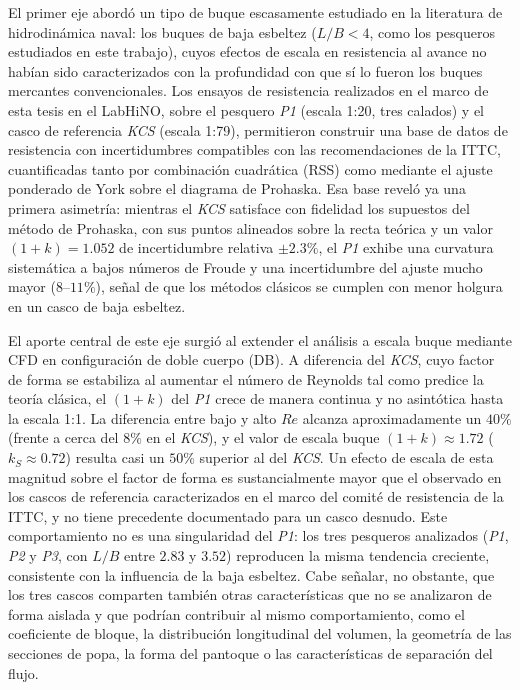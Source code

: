 El primer eje abordó un tipo de buque escasamente estudiado en la literatura de
hidrodinámica naval: los buques de baja esbeltez ($L/B < 4$, como los pesqueros
estudiados en este trabajo), cuyos efectos de escala en resistencia al avance no
habían sido caracterizados con la profundidad con que sí lo fueron los buques
mercantes convencionales. Los ensayos de resistencia realizados en el marco de esta
tesis en el LabHiNO, sobre el pesquero \textit{P1} (escala 1:20, tres calados) y el
casco de referencia \textit{KCS} (escala 1:79), permitieron construir una base de datos de resistencia con
incertidumbres compatibles con las recomendaciones de la ITTC, cuantificadas tanto
por combinación cuadrática (RSS) como mediante el ajuste ponderado de York sobre el
diagrama de Prohaska. Esa base reveló ya una primera asimetría: mientras el
\textit{KCS} satisface con fidelidad los supuestos del método de Prohaska, con sus
puntos alineados sobre la recta teórica y un valor $(1+k) = 1{.}052$ de
incertidumbre relativa $\pm 2{.}3\%$, el \textit{P1} exhibe una curvatura
sistemática a bajos números de Froude y una incertidumbre del ajuste mucho mayor
($8$--$11\%$), señal de que los métodos clásicos se cumplen con menor holgura en un
casco de baja esbeltez.

El aporte central de este eje surgió al extender el análisis a escala buque
mediante CFD en configuración de doble cuerpo (DB). A diferencia del \textit{KCS},
cuyo factor de forma se estabiliza al aumentar el número de Reynolds tal como
predice la teoría clásica, el $(1+k)$ del \textit{P1} crece de manera continua y no
asintótica hasta la escala 1:1. La diferencia entre bajo y alto $Re$ alcanza
aproximadamente un $40\%$ (frente a cerca del $8\%$ en el \textit{KCS}), y el valor
de escala buque $(1+k) \approx 1{.}72$ ($k_S \approx 0{.}72$) resulta casi un
$50\%$ superior al del \textit{KCS}. Un efecto de escala de esta magnitud sobre el
factor de forma es sustancialmente mayor que el observado en los cascos de
referencia caracterizados en el marco del comité de resistencia de la ITTC, y no
tiene precedente documentado para un casco desnudo. Este comportamiento no es una
singularidad del \textit{P1}: los tres pesqueros analizados (\textit{P1},
\textit{P2} y \textit{P3}, con $L/B$ entre $2{.}83$ y $3{.}52$) reproducen la misma
tendencia creciente, consistente con la influencia de la baja esbeltez. Cabe
señalar, no obstante, que los tres cascos comparten también otras características
que no se analizaron de forma aislada y que podrían contribuir al mismo
comportamiento, como el coeficiente de bloque, la distribución longitudinal del
volumen, la geometría de las secciones de popa, la forma del pantoque o las
características de separación del flujo.

